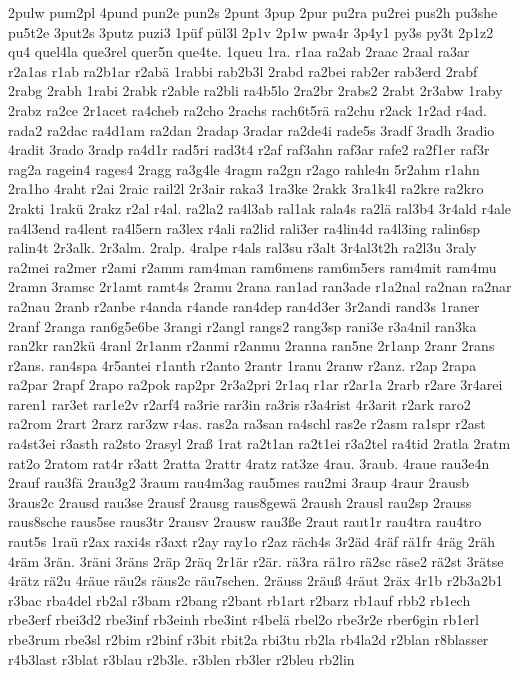 {2pulw
pum2pl
4pund
pun2e
pun2s
2punt
3pup
2pur
pu2ra
pu2rei
pus2h
pu3she
pu5t2e
3put2s
3putz
puzi3
1püf
pül3l
2p1v
2p1w
pwa4r
3p4y1
py3s
py3t
2p1z2
qu4
quel4la
que3rel
quer5n
que4te.
1queu
1ra.
r1aa
ra2ab
2raac
2raal
ra3ar
r2a1as
r1ab
ra2b1ar
r2abä
1rabbi
rab2b3l
2rabd
ra2bei
rab2er
rab3erd
2rabf
2rabg
2rabh
1rabi
2rabk
r2able
ra2bli
ra4b5lo
2ra2br
2rabs2
2rabt
2r3abw
1raby
2rabz
ra2ce
2r1acet
ra4cheb
ra2cho
2rachs
rach6t5rä
ra2chu
r2ack
1r2ad
r4ad.
rada2
ra2dac
ra4d1am
ra2dan
2radap
3radar
ra2de4i
rade5s
3radf
3radh
3radio
4radit
3rado
3radp
ra4d1r
rad5ri
rad3t4
r2af
raf3ahn
raf3ar
rafe2
ra2f1er
raf3r
rag2a
ragein4
rages4
2ragg
ra3g4le
4ragm
ra2gn
r2ago
rahle4n
5r2ahm
r1ahn
2ra1ho
4raht
r2ai
2raic
rail2l
2r3air
raka3
1ra3ke
2rakk
3ra1k4l
ra2kre
ra2kro
2rakti
1rakü
2rakz
r2al
r4al.
ra2la2
ra4l3ab
ral1ak
rala4s
ra2lä
ral3b4
3r4ald
r4ale
ra4l3end
ra4lent
ra4l5ern
ra3lex
r4ali
ra2lid
rali3er
ra4lin4d
ra4l3ing
ralin6sp
ralin4t
2r3alk.
2r3alm.
2ralp.
4ralpe
r4als
ral3su
r3alt
3r4al3t2h
ra2l3u
3raly
ra2mei
ra2mer
r2ami
r2amm
ram4man
ram6mens
ram6m5ers
ram4mit
ram4mu
2ramn
3ramsc
2r1amt
ramt4s
2ramu
2rana
ran1ad
ran3ade
r1a2nal
ra2nan
ra2nar
ra2nau
2ranb
r2anbe
r4anda
r4ande
ran4dep
ran4d3er
3r2andi
rand3s
1raner
2ranf
2ranga
ran6g5e6be
3rangi
r2angl
rangs2
rang3sp
rani3e
r3a4nil
ran3ka
ran2kr
ran2kü
4ranl
2r1anm
r2anmi
r2anmu
2ranna
ran5ne
2r1anp
2ranr
2rans
r2ans.
ran4spa
4r5antei
r1anth
r2anto
2rantr
1ranu
2ranw
r2anz.
r2ap
2rapa
ra2par
2rapf
2rapo
ra2pok
rap2pr
2r3a2pri
2r1aq
r1ar
r2ar1a
2rarb
r2are
3r4arei
raren1
rar3et
rar1e2v
r2arf4
ra3rie
rar3in
ra3ris
r3a4rist
4r3arit
r2ark
raro2
ra2rom
2rart
2rarz
rar3zw
r4as.
ras2a
ra3san
ra4schl
ras2e
r2asm
ra1spr
r2ast
ra4st3ei
r3asth
ra2sto
2rasyl
2raß
1rat
ra2t1an
ra2t1ei
r3a2tel
ra4tid
2ratla
2ratm
rat2o
2ratom
rat4r
r3att
2ratta
2rattr
4ratz
rat3ze
4rau.
3raub.
4raue
rau3e4n
2rauf
rau3fä
2rau3g2
3raum
rau4m3ag
rau5mes
rau2mi
3raup
4raur
2rausb
3raus2c
2rausd
rau3se
2rausf
2rausg
raus8gewä
2raush
2rausl
rau2sp
2rauss
raus8sche
raus5se
raus3tr
2rausv
2rausw
rau3ße
2raut
raut1r
rau4tra
rau4tro
raut5s
1raü
r2ax
raxi4s
r3axt
r2ay
ray1o
r2az
räch4s
3r2äd
4räf
rä1fr
4räg
2räh
4räm
3rän.
3räni
3räns
2räp
2räq
2r1är
r2är.
rä3ra
rä1ro
rä2sc
räse2
rä2st
3rätse
4rätz
rä2u
4räue
räu2s
räus2c
räu7schen.
2räuss
2räuß
4räut
2räx
4r1b
r2b3a2b1
r3bac
rba4del
rb2al
r3bam
r2bang
r2bant
rb1art
r2barz
rb1auf
rbb2
rb1ech
rbe3erf
rbei3d2
rbe3inf
rb3einh
rbe3int
r4belä
rbel2o
rbe3r2e
rber6gin
rb1erl
rbe3rum
rbe3sl
r2bim
r2binf
r3bit
rbit2a
rbi3tu
rb2la
rb4la2d
r2blan
r8blasser
r4b3last
r3blat
r3blau
r2b3le.
r3blen
rb3ler
r2bleu
rb2lin
}

